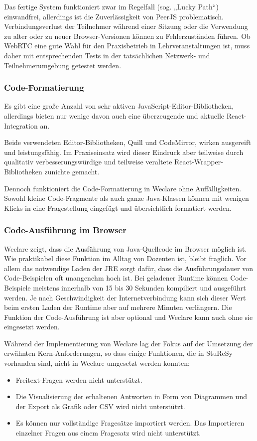 Das fertige System funktioniert zwar im Regelfall (sog. „Lucky Path“) einwandfrei, allerdings ist die Zuverlässigkeit von PeerJS problematisch. Verbindungsverlust der Teilnehmer während einer Sitzung oder die Verwendung zu alter oder zu neuer Browser-Versionen können zu Fehlerzuständen führen. Ob WebRTC eine gute Wahl für den Praxisbetrieb in Lehrveranstaltungen ist, muss daher mit entsprechenden Tests in der tatsächlichen Netzwerk- und Teilnehmerumgebung getestet werden.

\subsubsection*{Code-Formatierung}
Es gibt eine große Anzahl von sehr aktiven JavaScript-Editor-Bibliotheken, allerdings bieten nur wenige davon auch eine überzeugende und aktuelle React-Integration an.

Beide verwendeten Editor-Bibliotheken, Quill und CodeMirror, wirken ausgereift und leistungsfähig. Im Praxiseinsatz wird dieser Eindruck aber teilweise durch qualitativ verbesserungswürdige und teilweise veraltete React-Wrapper-Bibliotheken zunichte gemacht.

Dennoch funktioniert die Code-Formatierung in Weclare ohne Auffälligkeiten. Sowohl kleine Code-Fragmente als auch ganze Java-Klassen können mit wenigen Klicks in eine Fragestellung eingefügt und übersichtlich formatiert werden.

\subsubsection*{Code-Ausführung im Browser}
Weclare zeigt, dass die Ausführung von Java-Quellcode im Browser möglich ist. Wie praktikabel diese Funktion im Alltag von Dozenten ist, bleibt fraglich. Vor allem das notwendige Laden der JRE sorgt dafür, dass die Ausführungsdauer von Code-Beispielen oft unangenehm hoch ist. Bei geladener Runtime können Code-Beispiele meistens innerhalb von 15 bis 30 Sekunden kompiliert und ausgeführt werden. Je nach Geschwindigkeit der Internetverbindung kann sich dieser Wert beim ersten Laden der Runtime aber auf mehrere Minuten verlängern. Die Funktion der Code-Ausführung ist aber optional und Weclare kann auch ohne sie eingesetzt werden.

Während der Implementierung von Weclare lag der Fokus auf der Umsetzung der erwähnten Kern-Anforderungen, so dass einige Funktionen, die in StuReSy vorhanden sind, nicht in Weclare umgesetzt werden konnten:
\begin{itemize}
    \item Freitext-Fragen werden nicht unterstützt.
    \item Die Visualisierung der erhaltenen Antworten in Form von Diagrammen und der Export als Grafik oder CSV wird nicht unterstützt.
    \item Es können nur vollständige Fragesätze importiert werden. Das Importieren einzelner Fragen aus einem Fragesatz wird nicht unterstützt.
\end{itemize}


